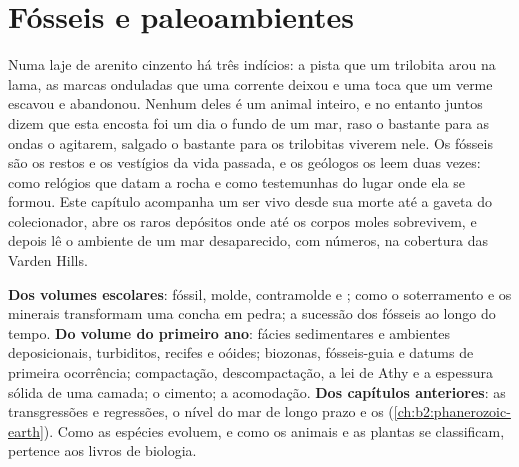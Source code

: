 \chapter{Fósseis e paleoambientes}\label{ch:b2:palaeoenvironments}

Numa laje de arenito cinzento há três indícios: a pista que um trilobita arou na lama,
as marcas onduladas que uma corrente deixou e uma toca que um verme escavou e abandonou. Nenhum deles é um
animal inteiro, e no entanto juntos dizem que esta encosta foi um dia o fundo de um mar, raso o
bastante para as ondas o agitarem, salgado o bastante para os trilobitas viverem nele. Os fósseis são os
restos e os vestígios da vida passada, e os geólogos os leem duas vezes: como relógios que datam a rocha
e como testemunhas do lugar onde ela se formou. Este capítulo acompanha um ser vivo desde sua morte
até a gaveta do colecionador, abre os raros depósitos onde até os corpos moles sobrevivem, e depois lê
o ambiente de um mar desaparecido, com números, na cobertura das Varden Hills.

\begin{recall}
\textbf{Dos volumes escolares}: fóssil, molde, contramolde e ; como o soterramento e os minerais
transformam uma concha em pedra; a sucessão dos fósseis ao longo do tempo. \textbf{Do volume do primeiro ano}:
fácies sedimentares e ambientes deposicionais, turbiditos, recifes e oóides; biozonas, fósseis-guia
e datums de primeira ocorrência; compactação, descompactação, a lei de Athy e a espessura sólida
de uma camada; o cimento; a acomodação. \textbf{Dos capítulos anteriores}: as transgressões e regressões,
o nível do mar de longo prazo e os  (\cref{ch:b2:phanerozoic-earth}). Como as
espécies evoluem, e como os animais e as plantas se classificam, pertence aos livros de biologia.
\end{recall}


